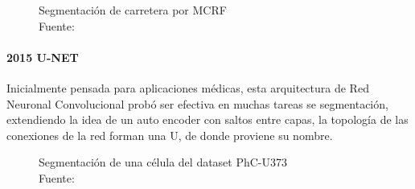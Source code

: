 \begin{figure}[H]
    \centering
    \qquad
    \caption[Segmentación de carretera por MCRF]{Segmentación de carretera por MCRF\\Fuente: \citep{segmentation-crf}}
\end{figure}

\paragraph{2015 U-NET}
Inicialmente pensada para aplicaciones médicas, esta arquitectura de Red Neuronal Convolucional probó ser efectiva en muchas tareas se segmentación, extendiendo la idea de un auto encoder con saltos entre capas, la topología de las conexiones de la red forman una U, de donde proviene su nombre. \citep{u-net}

\begin{figure}[H]
    \centering
    \qquad
    \caption[Segmentación de una célula del dataset PhC-U373]{Segmentación de una célula del dataset PhC-U373\\Fuente: \citep{u-net}}%
    \label{unet}%
\end{figure}


